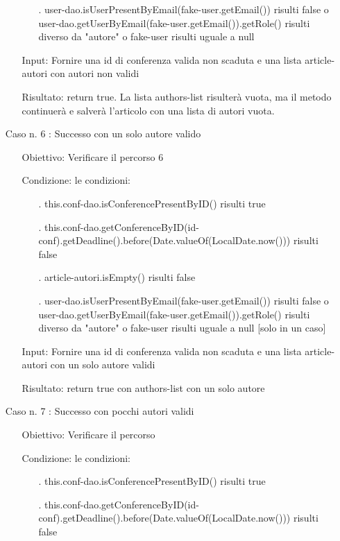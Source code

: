 \begin{itemize}
\begin{itemize}
\begin{itemize}
\item[.] user-dao.isUserPresentByEmail(fake-user.getEmail()) risulti false o user-dao.getUserByEmail(fake-user.getEmail()).getRole() risulti diverso da "autore" o  fake-user risulti uguale a null
\end{itemize}
\item[Input:]  Fornire una id di conferenza valida non scaduta e una lista article-autori con autori non validi
\item[Risultato:] return true. La lista authors-list risulterà vuota, ma il metodo continuerà e salverà l'articolo con una lista di autori vuota.
\end{itemize}
\item[Caso n. 6 :] Successo con un solo autore valido
\begin{itemize}
\item[Obiettivo:] Verificare il percorso 6
\item[Condizione:] le condizioni:
\begin{itemize}
\item[.]  this.conf-dao.isConferencePresentByID() risulti true
\item[.]  this.conf-dao.getConferenceByID(id-conf).getDeadline().before(Date.valueOf(LocalDate.now())) risulti false
\item[.] article-autori.isEmpty() risulti false
\item[.] user-dao.isUserPresentByEmail(fake-user.getEmail()) risulti false o user-dao.getUserByEmail(fake-user.getEmail()).getRole() risulti diverso da "autore" o  fake-user risulti uguale a null [solo in un caso]
\end{itemize}
\item[Input:] Fornire una id di conferenza valida non scaduta e una lista article-autori con un solo autore validi
\item[Risultato:] return true con authors-list con un solo autore
\end{itemize}
\item[Caso n. 7 :] Successo con pocchi autori validi
\begin{itemize}
\item[Obiettivo:] Verificare il percorso 
\item[Condizione:] le condizioni:
\begin{itemize}
\item[.]  this.conf-dao.isConferencePresentByID() risulti true
\item[.]  this.conf-dao.getConferenceByID(id-conf).getDeadline().before(Date.valueOf(LocalDate.now())) risulti false

\end{itemize}
\end{itemize}
\end{itemize}
